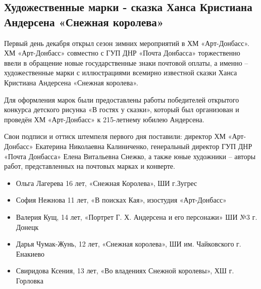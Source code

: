  
 
 
 
 
\subsection{Художественные марки - сказка Ханса Кристиана Андерсена «Снежная королева»}
\label{sec:01_12_2021.stz.news.dnr.artdonbass.1.marki_andersen}



Первый день декабря открыл сезон зимних мероприятий в ХМ «Арт-Донбасс».  ХМ
«Арт-Донбасс» совместно с ГУП ДНР «Почта Донбасса» торжественно ввели в
обращение новые государственные знаки почтовой оплаты, а именно –
художественные марки с иллюстрациями всемирно известной сказки Ханса Кристиана
Андерсена «Снежная королева».


Для оформления марок были предоставлены работы победителей открытого конкурса
детского рисунка «В гостях у сказки», который был организован и проведён ХМ
«Арт-Донбасс» к 215-летнему юбилею Андерсена.


Свои подписи и оттиск штемпеля первого дня поставили: директор ХМ «Арт-Донбасс»
Екатерина Николаевна Калиниченко, генеральный директор ГУП ДНР «Почта Донбасса»
Елена Витальевна Снежко, а также юные художники – авторы работ, представленных
на почтовых марках и конверте.

\begin{itemize}
  \item Ольга Лагерева 16 лет, «Снежная Королева», ШИ г.Зугрес
  \item София Нежнова 11 лет, «В поисках Кая», изостудия «Арт-Донбасс»
  \item Валерия Кущ, 14 лет, «Портрет Г. Х. Андерсена и его персонажи» ШИ №3 г. Донецк
  \item Дарья Чумак-Жунь, 12 лет, «Снежная королева», ШИ им. Чайковского г. Енакиево
  \item Свиридова Ксения, 13 лет, «Во владениях Снежной королевы», ХШ г. Горловка
\end{itemize}

